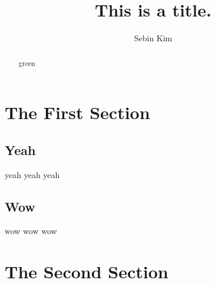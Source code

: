 \documentclass{article}
\title{This is a title.}
\author{Sebin Kim}
\begin{document}
\maketitle

\begin{abstract}
	green
\end{abstract}

\section{The First Section}

\subsection{Yeah}
yeah yeah yeah

\subsection{Wow}
wow wow wow

\section{The Second Section}
\end{document}
